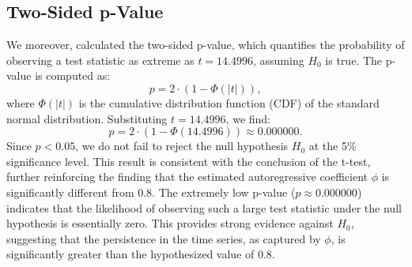\documentclass[a4paper,12pt]{article}
\begin{document}
\subsection{Two-Sided p-Value}
We moreover, calculated the two-sided p-value, which quantifies the probability of observing a test statistic as extreme as \( t = 14.4996 \), assuming \( H_0 \) is true. The p-value is computed as:
\[
p = 2 \cdot (1 - \Phi(|t|)),
\]
where \( \Phi(|t|) \) is the cumulative distribution function (CDF) of the standard normal distribution. Substituting \( t = 14.4996 \), we find:
\[
p = 2 \cdot (1 - \Phi(14.4996)) \approx 0.000000.
\]
Since \( p < 0.05 \), we do not fail to reject the null hypothesis \( H_0 \) at the 5\% significance level. This result is consistent with the conclusion of the t-test, further reinforcing the finding that the estimated autoregressive coefficient \(\phi\) is significantly different from 0.8.
The extremely low p-value (\( p \approx 0.000000 \)) indicates that the likelihood of observing such a large test statistic under the null hypothesis is essentially zero. This provides strong evidence against \( H_0 \), suggesting that the persistence in the time series, as captured by \(\phi\), is significantly greater than the hypothesized value of 0.8.
\end{document}
